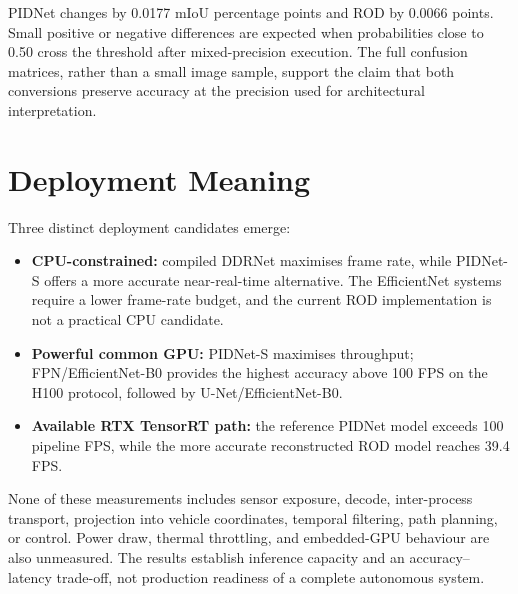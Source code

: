 PIDNet changes by 0.0177 mIoU percentage points and ROD by 0.0066 points.
Small positive or negative differences are expected when probabilities close
to 0.50 cross the threshold after mixed-precision execution. The full confusion
matrices, rather than a small image sample, support the claim that both
conversions preserve accuracy at the precision used for architectural
interpretation.

\section{Deployment Meaning}

Three distinct deployment candidates emerge:
\begin{itemize}
  \item \textbf{CPU-constrained:} compiled DDRNet maximises frame rate, while
  PIDNet-S offers a more accurate near-real-time alternative. The
  EfficientNet systems require a lower frame-rate budget, and the current ROD
  implementation is not a practical CPU candidate.
  \item \textbf{Powerful common GPU:} PIDNet-S maximises throughput;
  FPN/EfficientNet-B0 provides the highest accuracy above 100 FPS on the H100
  protocol, followed by U-Net/EfficientNet-B0.
  \item \textbf{Available RTX TensorRT path:} the reference PIDNet model
  exceeds 100 pipeline FPS, while the more accurate reconstructed ROD model
  reaches 39.4 FPS.
\end{itemize}

None of these measurements includes sensor exposure, decode, inter-process
transport, projection into vehicle coordinates, temporal filtering, path
planning, or control. Power draw, thermal throttling, and embedded-GPU
behaviour are also unmeasured. The results establish inference capacity and an
accuracy--latency trade-off, not production readiness of a complete autonomous
system.
